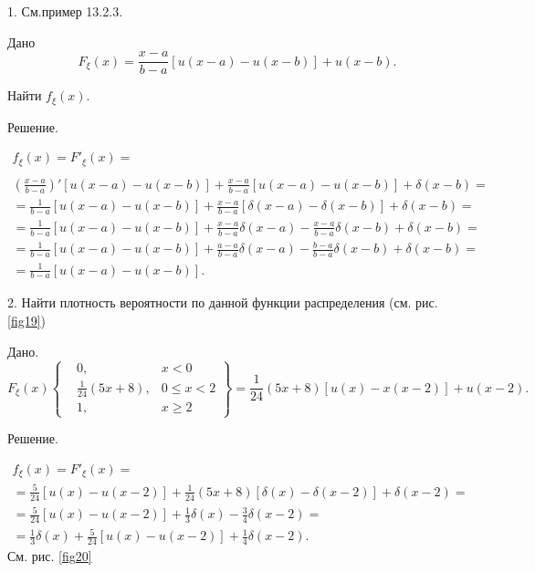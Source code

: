 \begin{example}
\label{ex:13.6}
	1. См.пример 13.2.3. 

	Дано
	\begin{equation*}
		F_{\xi}(x)=\frac{x-a}{b-a}[u(x-a)-u(x-b)]+u(x-b).
	\end{equation*}

	Найти $f_{\xi}(x)$.

	Решение.

	\begin{gather*}
		f_{\xi}(x)=F'_{\xi}(x)=\\
		\\\left(\frac{x-a}{b-a}\right)'[u(x-a)-u(x-b)]+\frac{x-a}{b-a}
		[u(x-a)-u(x-b)]+\delta(x-b)=\\
		=\frac{1}{b-a}[u(x-a)-u(x-b)]+\frac{x-a}{b-a}[\delta(x-a)-\delta(x-b)]+\delta(x-b)=
	\end{gather*}
	\begin{gather*}
		=\frac{1}{b-a}[u(x-a)-u(x-b)]+\frac{x-a}{b-a}\delta(x-a)
		-\frac{x-a}{b-a}\delta(x-b)+\delta(x-b)=\\=
		\frac{1}{b-a}[u(x-a)-u(x-b)]+\frac{a-a}{b-a}\delta(x-a)-\frac{b-a}{b-a}\delta(x-b)+\delta(x-b)=\\=\frac{1}{b-a}[u(x-a)-u(x-b)].
	\end{gather*}

	2. Найти плотность вероятности по данной функции распределения
	(см. рис. \ref{fig19})
	
	Дано.
	\begin{equation*}
		F_{\xi}(x)
		\left\{\begin{aligned}
			&0, &x<0 \\
			&\frac{1}{24}(5x+8), &0\leqslant x<2 \\
			&1, &x\geqslant 2
		\end{aligned}\right\}
		=\frac{1}{24}(5x+8)[u(x)-x(x-2)]+u(x-2).
	\end{equation*}

	Решение.

	\begin{gather*}
		f_{\xi}(x)=F'_{\xi}(x)=\\=
		\frac{5}{24}[u(x)-u(x-2)]+\frac{1}{24}(5x+8)[\delta(x)-\delta(x-2)]+\delta(x-2)=\\=
		\frac{5}{24}[u(x)-u(x-2)]+\frac{1}{3}\delta(x)-\frac{3}{4}\delta(x-2)=\\=
		\frac{1}{3}\delta(x)+\frac{5}{24}[u(x)-u(x-2)]+\frac{1}{4}\delta(x-2).
	\end{gather*}
	См. рис. \ref{fig20}
\end{example}
